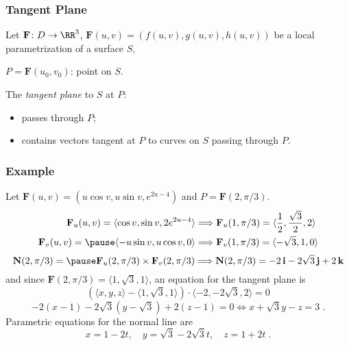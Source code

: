 \begin{frame}
  \frametitle{Tangent Plane}

  Let $\textbf{F} \colon D \to \RR^3$, $\textbf{F}(u,v) = (f(u,v), g(u,v), h(u,v))$ be a local parametrization of a surface $S$,

  $P = \textbf{F}(u_0,v_0)$: point on $S$.

  The \emph{tangent plane} to $S$ at $P$:
  \begin{itemize}
    \item passes through $P$;
    \item contains vectors tangent at $P$ to curves on $S$ passing through $P$.
  \end{itemize}
\begin{overlayarea}{\textheight}{5cm}
\end{overlayarea}

\end{frame}

\begin{frame}
  \frametitle{Example}

  Let $\textbf{F}(u,v) = (u\cos{v}, u\sin{v}, e^{2u-4})$ and $P=\textbf{F}(2, \pi/3)$. \pause
%
\begin{align*}
  \textbf{F}_u(u,v) =  \langle \cos{v}, \sin{v}, 2e^{2u-4}\rangle & \Longrightarrow \textbf{F}_u(1,\pi/3) = \langle \frac{1}{2}, \frac{\sqrt{3}}{2}, 2\rangle \\
  \textbf{F}_v(u,v) = \pause \langle -u\sin{v}, u\cos{v}, 0 \rangle & \Longrightarrow \textbf{F}_v(1,\pi/3) = \langle -\sqrt{3}, 1, 0 \rangle
\end{align*}
%
\pause
%
$$\textbf{N}(2,\pi/3) = \pause \textbf{F}_u(2,\pi/3) \times \textbf{F}_v(2,\pi/3)  \Longrightarrow \textbf{N}(2,\pi/3) = -2 \, \textbf{i} - 2\sqrt{3}\, \textbf{j} + 2\,\textbf{k}$$
%
and since $\textbf{F}(2,\pi/3) = \langle 1, \sqrt{3},1\rangle$, an equation for the tangent plane is\pause
%
$$(\langle x,y,z\rangle - \langle 1, \sqrt{3},1\rangle) \cdot \langle -2, -2\sqrt{3}, 2\rangle = 0$$
%
$$-2(x-1) -2\sqrt{3}(y-\sqrt{3}) +2(z-1) = 0 \Longleftrightarrow x + \sqrt{3} y -z = 3\; .$$
\pause
Parametric equations for the normal line are\pause
%
$$x= 1-2t, \quad y=\sqrt{3} -2\sqrt{3} t,\quad z = 1+2t\; .$$
\end{frame}

